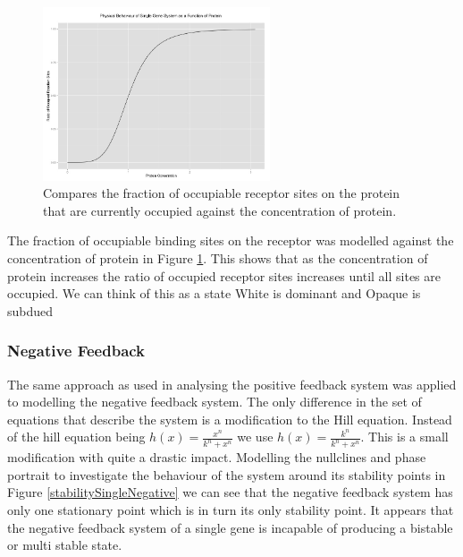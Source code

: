 \documentclass[]{article}
\begin{document}
                    
             \begin{figure}[h]
            \centering
            \includegraphics[width=0.6\textwidth]{./figures/singlePositiveHill.jpeg}
            \caption{Compares the fraction of occupiable receptor sites on the protein that are currently occupied against the concentration of protein.}
            \label{singlePositiveHill}
            \end{figure}
    
            The fraction of occupiable binding sites on the receptor was modelled against the concentration of protein in Figure \ref{singlePositiveHill}. This shows that as the concentration of protein increases the ratio of occupied receptor sites increases until all sites are occupied. We can think of this as a state %
            White is dominant and Opaque is subdued %
            
            \subsubsection{Negative Feedback} 
            The same approach as used in analysing the positive feedback system was applied to modelling the negative feedback system. The only difference in the set of equations that describe the system is a modification to the Hill equation. Instead of the hill equation being $h(x) = \frac{x^n}{k^n + x^n}$ we use $h(x) = \frac{k^n}{k^n+x^n}$. This is a small modification with quite a drastic impact. Modelling the nullclines and phase portrait to investigate the behaviour of the system around its stability points in Figure \ref{stabilitySingleNegative} we can see that the negative feedback system has only one stationary point which is in turn its only stability point. It appears that the negative feedback system of a single gene is incapable of producing a bistable or multi stable state.
            
\end{document}
